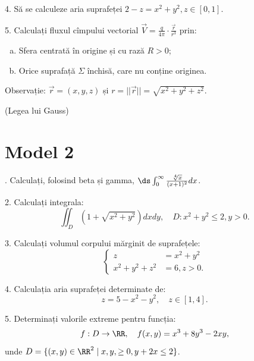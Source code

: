 \vspace{1cm}

4. Să se calculeze aria suprafeței $2 - z = x^2 + y^2, z \in [0, 1]$.

\vspace{1cm}

5. Calculați fluxul cîmpului vectorial $\vec{V} = \frac{q}{4 \pi} \cdot \frac{\vec{r}}{r^3}$
prin:
\begin{enumerate}[(a)]
\item Sfera centrată în origine și cu rază $R > 0$;
\item Orice suprafață $\Sigma$ închisă, care nu conține originea.
\end{enumerate}
Observație: $\vec{r} = (x, y, z)$ și $r = ||\vec{r}|| = \sqrt{x^2 + y^2 + z^2}$.

(Legea lui Gauss)


\section{Model 2}

\indent{}. Calculați, folosind beta și gamma,
$ \ds\int_0^\infty \frac{\sqrt[4]{x}}{(x + 1)^2} dx $.

\vspace{1cm}

2. Calculați integrala:
\[
  \iint_D (1 + \sqrt{x^2 + y^2}) dxdy, \quad D: x^2 + y^2 \leq 2, y > 0.
\]

\vspace{1cm}

3. Calculați volumul corpului mărginit de suprafețele:
\[
  \begin{cases}
    z &= x^2 + y^2 \\
    x^2 + y^2 + z^2 &= 6, z > 0.
  \end{cases}
\]

\vspace{1cm}

4. Calculația aria suprafeței determinate de:
\[
  z = 5 - x^2 - y^2, \quad z \in [1, 4].
\]

\vspace{1cm}

5. Determinați valorile extreme pentru funcția:
\[
  f : D \to \RR, \quad f(x, y) = x^3 + 8y^3 - 2xy,
\]
unde $ D = \{(x, y) \in \RR^2 \mid x, y, \geq 0, y + 2x \leq 2 \} $.


